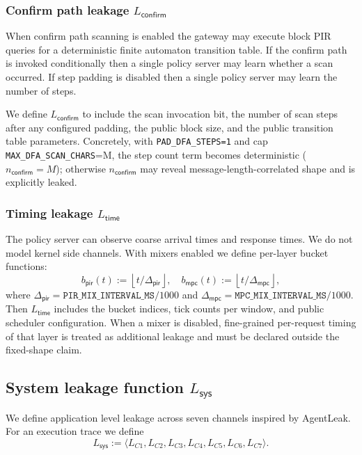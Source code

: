 \subsubsection{Confirm path leakage $L_{\mathsf{confirm}}$}

When confirm path scanning is enabled the gateway may execute block PIR queries for a deterministic finite automaton transition table.
If the confirm path is invoked conditionally then a single policy server may learn whether a scan occurred.
If step padding is disabled then a single policy server may learn the number of steps.

We define $L_{\mathsf{confirm}}$ to include
the scan invocation bit,
the number of scan steps after any configured padding,
the public block size,
and the public transition table parameters.
Concretely, with \texttt{PAD\_DFA\_STEPS=1} and cap \texttt{MAX\_DFA\_SCAN\_CHARS}=M, the step count
term becomes deterministic ($n_{\mathsf{confirm}}=M$); otherwise $n_{\mathsf{confirm}}$ may reveal
message-length-correlated shape and is explicitly leaked.

\subsubsection{Timing leakage $L_{\mathsf{time}}$}

The policy server can observe coarse arrival times and response times.
We do not model kernel side channels.
With mixers enabled we define per-layer bucket functions:
\[
b_{\mathsf{pir}}(t):=\left\lfloor t/\Delta_{\mathsf{pir}}\right\rfloor,\quad
b_{\mathsf{mpc}}(t):=\left\lfloor t/\Delta_{\mathsf{mpc}}\right\rfloor,
\]
where $\Delta_{\mathsf{pir}}=\texttt{PIR\_MIX\_INTERVAL\_MS}/1000$ and
$\Delta_{\mathsf{mpc}}=\texttt{MPC\_MIX\_INTERVAL\_MS}/1000$.
Then $L_{\mathsf{time}}$ includes the bucket indices, tick counts per window, and public scheduler
configuration.
When a mixer is disabled, fine-grained per-request timing of that layer is treated as additional
leakage and must be declared outside the fixed-shape claim.

\subsection{System leakage function $L_{\mathsf{sys}}$}

We define application level leakage across seven channels inspired by AgentLeak.
For an execution trace we define
\[
L_{\mathsf{sys}} := \langle L_{C1}, L_{C2}, L_{C3}, L_{C4}, L_{C5}, L_{C6}, L_{C7} \rangle .
\]


